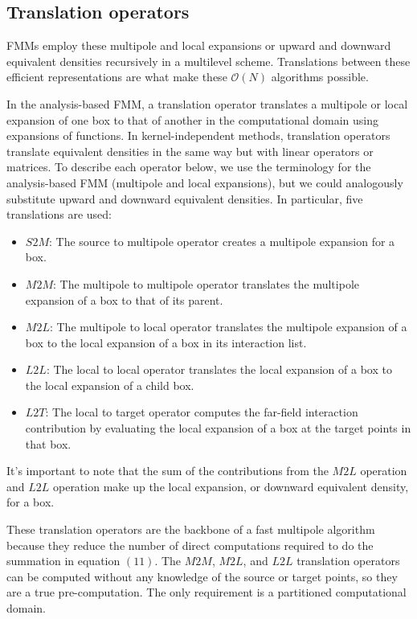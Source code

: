 \documentclass[11pt, oneside]{article}   	%
\begin{document}
\subsection{Translation operators}
FMMs employ these multipole and local expansions or upward and downward equivalent densities recursively in a multilevel scheme. Translations between these efficient representations are what make these $\mathcal{O}(N)$ algorithms possible.

In the analysis-based FMM, a translation operator translates a multipole or local expansion of one box to that of another in the computational domain using expansions of functions. In kernel-independent methods, translation operators translate equivalent densities in the same way but with linear operators or matrices. To describe each operator below, we use the terminology for the analysis-based FMM (multipole and local expansions), but we could analogously substitute upward and downward equivalent densities. In particular, five translations are used:

\begin{itemize}
\item $S2M$: The source to multipole operator creates a multipole expansion for a box.

\item $M2M$: The multipole to multipole operator translates the multipole expansion of a box to that of its parent.

\item $M2L$: The multipole to local operator translates the multipole expansion of a box to the local expansion of a box in its interaction list.

\item $L2L$: The local to local operator translates the local expansion of a box to the local expansion of a child box.

\item $L2T$: The local to target operator computes the far-field interaction contribution by evaluating the local expansion of a box at the target points in that box.
\end{itemize}

It's important to note that the sum of the contributions from the $M2L$ operation and $L2L$ operation make up the local expansion, or downward equivalent density, for a box.

These translation operators are the backbone of a fast multipole algorithm because they reduce the number of direct computations required to do the summation in equation $(11)$. The $M2M$, $M2L$, and $L2L$ translation operators can be computed without any knowledge of the source or target points, so they are a true pre-computation. The only requirement is a partitioned computational domain.
\end{document}
